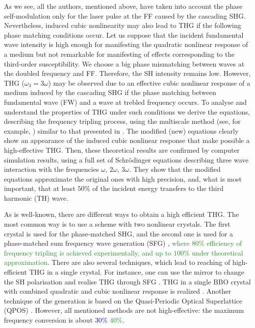 \documentclass[a4paper, 12pt, onecolumn]{extarticle}
\begin{document}
As we see, all the authors, mentioned above, have taken into account the phase self-modulation only for the laser pulse at the FF caused by the cascading SHG. Nevertheless, induced cubic nonlinearity may also lead to THG if the following phase matching conditions occur. Let us suppose that the incident fundamental wave intensity is high enough for manifesting the quadratic nonlinear response of a medium but not remarkable for manifesting of effects corresponding to the third-order susceptibility. We choose a big phase mismatching between waves at the doubled frequency and FF. Therefore, the SH intensity remains low. However, THG (\(\omega_3=3\omega\)) may be observed due to an effective cubic nonlinear response of a medium induced by the cascading SHG if the phase matching between fundamental wave (FW) and a wave at trebled frequency occurs. To analyse and understand the properties of THG under such conditions we derive the equations, describing the frequency tripling process, using the multiscale method (see, for example, \cite{bib:n24}) similar to that presented in \cite{bib:n19}. The modified (new) equations clearly show an appearance of the induced cubic nonlinear response that make possible a high-effective THG. Then, these theoretical results are confirmed by computer simulation results, using a full set of Schr\"{o}dinger equations describing three wave interaction with the frequencies \(\omega,\,2\omega,\,3\omega\). They show that the modified equations approximate the original ones with high precision, and, what is most important, that at least $50\%$ of the incident energy transfers to the third harmonic (TH) wave.

As is well-known, there are different ways to obtain a high efficient THG. The most common way is to use a scheme with two nonlinear crystals. The first crystal is used for the phase-matched SHG, and the second one is used for a phase-matched sum frequency wave generation (SFG) \cite{bib:t4}, \textcolor{ForestGreen}{where $80\%$ efficiency of frequency tripling is achieved experimentally, and up to $100\%$ under theoretical approximation}. There are also several techniques, which lead to reaching of high-efficient THG in a single crystal. For instance, one can use the mirror to change the SH polarisation and realise THG through SFG \cite{bib:t3}. THG in a single BBO crystal with combined quadratic and cubic nonlinear response is realized \cite{bib:t1}. Another technique of the generation is based on the Quasi-Periodic Optical Superlattice (QPOS) \cite{bib:t2}. However, all mentioned methods are not high-effective: the maximum frequency conversion is about \textcolor{blue}{$30\%$} \textcolor{ForestGreen}{$40\%$}.
\end{document}

